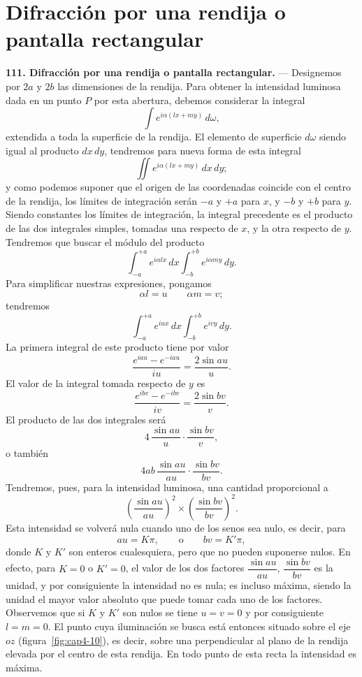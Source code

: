\section{Difracción por una rendija o pantalla rectangular}

\noindent\textbf{111. Difracción por una rendija o pantalla rectangular.}
— Designemos por $2a$ y $2b$ las dimensiones de la rendija. Para obtener
la intensidad luminosa dada en un punto $P$ por esta abertura, debemos
considerar la integral
\[
\int e^{i\alpha(lx+my)}\,d\omega,
\]
extendida a toda la superficie de la rendija. El elemento de superficie
$d\omega$ siendo igual al producto $dx\,dy$, tendremos para nueva forma
de esta integral
\[
\iint e^{i\alpha(lx+my)}\,dx\,dy;
\]
y como podemos suponer que el origen de las coordenadas coincide con el
centro de la rendija, los límites de integración serán $-a$ y $+a$ para
$x$, y $-b$ y $+b$ para $y$. Siendo constantes los límites de
integración, la integral precedente es el producto de las dos integrales
simples, tomadas una respecto de $x$, y la otra respecto de $y$.
Tendremos que buscar el módulo del producto
\[
\int_{-a}^{+a} e^{i\alpha lx}\,dx \int_{-b}^{+b} e^{i\alpha my}\,dy.
\]
Para simplificar nuestras expresiones, pongamos
\begin{equation}
\alpha l=u\qquad \alpha m=v;
\tag{1}
\end{equation}
tendremos
\[
\int_{-a}^{+a} e^{iux}\,dx \int_{-b}^{+b} e^{ivy}\,dy.
\]
La primera integral de este producto tiene por valor
\[
\frac{e^{iau}-e^{-iau}}{iu} = \frac{2\sin au}{u}.
\]
El valor de la integral tomada respecto de $y$ es
\[
\frac{e^{ibv}-e^{-ibv}}{iv} = \frac{2\sin bv}{v}.
\]
El producto de las dos integrales será
\[
4\,\frac{\sin au}{u}\cdot\frac{\sin bv}{v},
\]
o también
\[
4ab\,\frac{\sin au}{au}\cdot\frac{\sin bv}{bv}.
\]
Tendremos, pues, para la intensidad luminosa, una cantidad proporcional a
\begin{equation}
\left(\frac{\sin au}{au}\right)^2 \times \left(\frac{\sin bv}{bv}\right)^2.
\tag{2}
\end{equation}
Esta intensidad se volverá nula cuando uno de los senos sea nulo, es
decir, para
\begin{equation}
au=K\pi,\qquad\text{o}\qquad bv=K'\pi,
\tag{3}
\end{equation}
donde $K$ y $K'$ son enteros cualesquiera, pero que no pueden suponerse
nulos. En efecto, para $K=0$ o $K'=0$, el valor de los dos factores
$\dfrac{\sin au}{au}$, $\dfrac{\sin bv}{bv}$ es la unidad, y por
consiguiente la intensidad no es nula; es incluso máxima, siendo la
unidad el mayor valor absoluto que puede tomar cada uno de los factores.
Observemos que si $K$ y $K'$ son nulos se tiene $u=v=0$ y por
consiguiente $l=m=0$. El punto cuya iluminación se busca está entonces
situado sobre el eje $oz$ (figura~\ref{fig:cap4-10}), es decir, sobre una
perpendicular al plano de la rendija elevada por el centro de esta
rendija. En todo punto de esta recta la intensidad es máxima.

